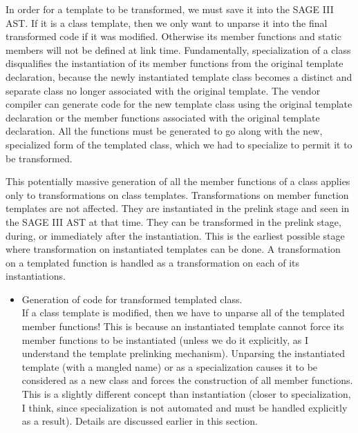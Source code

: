 \begin{enumerate}
           In order for a template to be transformed, we must save it into the 
           SAGE III AST. If it is a class template, then we only want to unparse 
           it into the final transformed code if it was modified. Otherwise its
           member functions and static members will not be defined at link time.
           Fundamentally, specialization of a class disqualifies the instantiation of its 
           member functions from the original template declaration, because the newly 
           instantiated template class becomes a distinct and separate class no longer 
           associated with the original template. The vendor 
           compiler can generate code for the new template class using the original
           template declaration or the member functions associated with the original 
           template declaration. All the functions must be generated to go
           along with the new, specialized form of the templated class, which we had to 
           specialize to permit it to be transformed.

           This potentially massive generation of all the member functions of a class
           applies only to transformations on class templates.  Transformations on member
           function templates are not affected.  They are instantiated in the prelink stage
           and seen in the SAGE III AST at that time. They can be transformed in the prelink
           stage, during, or immediately after the instantiation. This is the earliest possible
           stage where transformation on instantiated templates can be done.  A transformation
           on a templated function is handled as a transformation on each of its instantiations.
          \begin{itemize}
               \item Generation of code for transformed templated class. \\
                     If a class template is modified, then we have to unparse all of the 
                     templated member functions!  This is because an instantiated template
                     cannot force its member functions to be instantiated (unless we do
                     it explicitly, as I understand the template prelinking mechanism). Unparsing
                     the instantiated template (with a mangled name) or as a specialization
                     causes it to be considered as a new class and forces the
                     construction of all member functions. This is a slightly different concept
                     than instantiation (closer to specialization, I think, since
                     specialization is not automated and must be handled explicitly as a 
                     result). Details are discussed earlier in this section.


\end{itemize}
\end{enumerate}
